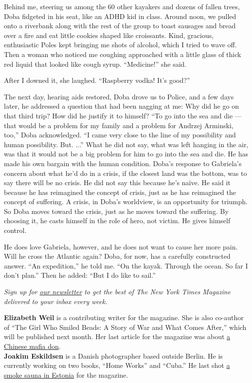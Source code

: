 Behind me, steering us among the 60 other kayakers and dozens of fallen
trees, Doba fidgeted in his seat, like an ADHD kid in class. Around
noon, we pulled onto a riverbank along with the rest of the group to
toast sausages and bread over a fire and eat little cookies shaped like
croissants. Kind, gracious, enthusiastic Poles kept bringing me shots of
alcohol, which I tried to wave off. Then a woman who noticed me coughing
approached with a little glass of thick red liquid that looked like
cough syrup. ``Medicine!'' she said.

After I downed it, she laughed. ``Raspberry vodka! It's good?''

The next day, hearing aids restored, Doba drove us to Police, and a few
days later, he addressed a question that had been nagging at me: Why did
he go on that third trip? How did he justify it to himself? ``To go into
the sea and die --- that would be a problem for my family and a problem
for Andrzej Arminski, too,'' Doba acknowledged. ``I came very close to
the line of my possibility and human possibility. But. ...'' What he did
not say, what was left hanging in the air, was that it would not be a
big problem for him to go into the sea and die. He has made his own
bargain with the human condition. Doba's response to Gabriela's concern
about what he'd do in a crisis, if the closest land was the bottom, was
to say there will be no crisis. He did not say this because he's naïve.
He said it because he has reimagined the concept of crisis, just as he
has reimagined the concept of suffering. A crisis, in Doba's worldview,
is an opportunity for triumph. So Doba moves toward the crisis, just as
he moves toward the suffering. By choosing it, he casts himself in the
role of hero, not victim. He gives himself control.

He does love Gabriela, however, and he does not want to cause her more
pain. Will he cross the Atlantic again? Doba, for now, has a carefully
constructed answer. ``An expedition,'' he told me. ``On the kayak.
Through the ocean. So far I don't plan.'' Then he added: ``But I do like
to sail.''

\emph{Sign up for
\href{http://www.nytimes3xbfgragh.onion/newsletters/magazine}{our
newsletter} to get the best of The New York Times Magazine delivered to
your inbox every week.}

\textbf{Elizabeth Weil} is a contributing writer for the magazine. She
is also co-author of ``The Girl Who Smiled Beads: A Story of War and
What Comes After,'' which will be published next month. Her last article
for the magazine was about
\href{https://www.nytimes3xbfgragh.onion/2015/10/18/magazine/shrimp-boys-day-in-court.html}{a
Chinese mafia don}.\\
\textbf{Joakim Eskildsen} is a Danish photographer based outside Berlin.
He is currently working on two books, ``Home Works'' and ``Cuba.'' He
last shot
\href{https://www.nytimes3xbfgragh.onion/interactive/2017/09/21/magazine/voyages-issue-photographs-family-vacations-around-world.html\#estonia}{a
smoke sauna in Estonia} for the magazine.


